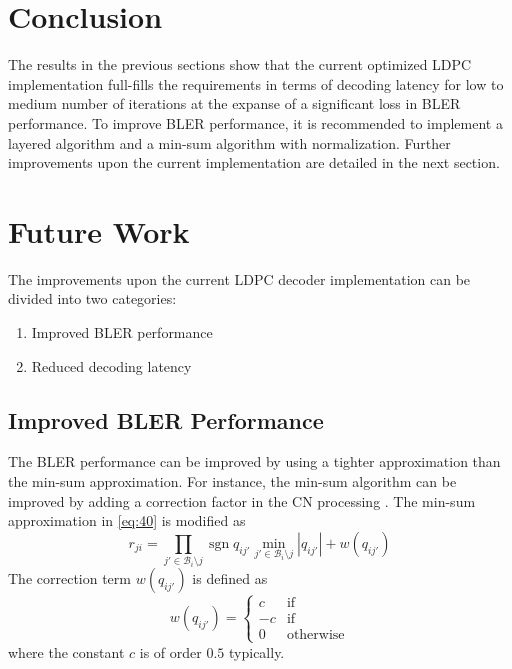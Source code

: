 \documentclass{article}
\def\Bcal{\mathcal{B}}
\newcommand{\sgn}{\operatorname{sgn}}
\begin{document}
\section{Conclusion}
\label{sec:conclusion}

The results in the previous sections show that the current optimized LDPC implementation full-fills the requirements in terms of decoding latency for low to medium number of iterations at the expanse of a significant loss in BLER performance. To improve BLER performance, it is recommended to implement a layered algorithm and a min-sum algorithm with normalization. Further improvements upon the current implementation are detailed in the next section.

\newpage
\section{Future Work}
\label{sec:future-work}

The improvements upon the current LDPC decoder implementation can be divided into two categories:
\begin{enumerate}
\item Improved BLER performance
\item Reduced decoding latency
\end{enumerate}

\subsection{Improved BLER Performance}
\label{sec:impr-bler-perf}

The BLER performance can be improved by using a tighter approximation than the min-sum approximation. For instance, the min-sum algorithm can be improved by adding a correction factor in the CN processing . The min-sum approximation in \eqref{eq:40} is modified as
\begin{equation}
  \label{eq:50}
  r_{ji} = \prod_{j'\in\Bcal_i\setminus j}\sgn q_{ij'}\min_{j'\in\Bcal_i\setminus j} |q_{ij'}| + w(q_{ij'})
\end{equation}
The correction term $w(q_{ij'})$ is defined as
\begin{equation}
  \label{eq:51}
  w(q_{ij'}) =
  \begin{cases}
     c & \textrm{if}~  \\
    -c & \textrm{if}~ \\
     0 & \textrm{otherwise}
  \end{cases}
\end{equation}
where the constant $c$ is of order $0.5$ typically.
\end{document}
